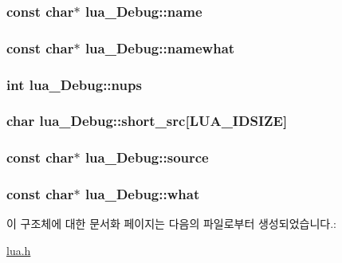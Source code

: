 \hypertarget{structlua___debug_a2978ab7f2ade479a003beb16d3b7a993}{
\subsubsection[{name}]{\setlength{\rightskip}{0pt plus 5cm}const char$\ast$ {\bf lua\-\_\-\-Debug\-::name}}}\label{structlua___debug_a2978ab7f2ade479a003beb16d3b7a993}
\hypertarget{structlua___debug_a7e8c201950ea4dd3f2c7df9e1201019a}{
\subsubsection[{namewhat}]{\setlength{\rightskip}{0pt plus 5cm}const char$\ast$ {\bf lua\-\_\-\-Debug\-::namewhat}}}\label{structlua___debug_a7e8c201950ea4dd3f2c7df9e1201019a}
\hypertarget{structlua___debug_a983807ecf0dfa3e5e77fe7f0e2fd9d49}{
\subsubsection[{nups}]{\setlength{\rightskip}{0pt plus 5cm}int {\bf lua\-\_\-\-Debug\-::nups}}}\label{structlua___debug_a983807ecf0dfa3e5e77fe7f0e2fd9d49}
\hypertarget{structlua___debug_a9b953c2fa9ef95a72a9ffc423744e1a4}{
\subsubsection[{short\-\_\-src}]{\setlength{\rightskip}{0pt plus 5cm}char {\bf lua\-\_\-\-Debug\-::short\-\_\-src}\mbox{[}{\bf \-L\-U\-A\-\_\-\-I\-D\-S\-I\-Z\-E}\mbox{]}}}\label{structlua___debug_a9b953c2fa9ef95a72a9ffc423744e1a4}
\hypertarget{structlua___debug_a422bceba8605d96bce4d19ce801a62e4}{
\subsubsection[{source}]{\setlength{\rightskip}{0pt plus 5cm}const char$\ast$ {\bf lua\-\_\-\-Debug\-::source}}}\label{structlua___debug_a422bceba8605d96bce4d19ce801a62e4}
\hypertarget{structlua___debug_afbf8df5f26e9c345378a7eb402eed081}{
\subsubsection[{what}]{\setlength{\rightskip}{0pt plus 5cm}const char$\ast$ {\bf lua\-\_\-\-Debug\-::what}}}\label{structlua___debug_afbf8df5f26e9c345378a7eb402eed081}


이 구조체에 대한 문서화 페이지는 다음의 파일로부터 생성되었습니다.\-:\begin{DoxyCompactItemize}
\item 
\hyperlink{lua_8h}{lua.\-h}\end{DoxyCompactItemize}
